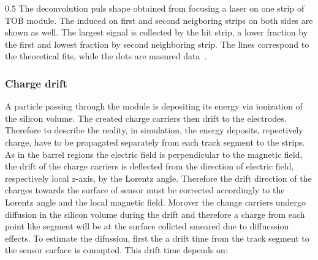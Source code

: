 

                 {0.5}       %
                 { The deconvolution puls shape obtained from focusing a laser on one strip of TOB module. The induced on first and second neigboring strips on both sides are shown as well.  The largest signal is collected by the hit strip, a lower fraction by the first and lowest fraction by second neighboring strip. The lines correspond to the theoretical fits, while the dots are masured data~\cite{Delaere:1061284}.  }


\subsubsection{Charge drift}

A particle passing through the module is depositing its energy via ionization of the silicon volume. The created charge carriers then drift to the electrodes. Therefore to describe the reality, in simulation, the energy deposits, repectively charge, have to be propagated separately from each track segment to the strips. As in the barrel regions the electric field is perpendicular to the magnetic field, the drift of the charge carriers is deflected from the direction of electric field, respectively local z-axis, by the Lorentz angle. Therefore the drift direction of the charges towards the surface of sensor must be corrected accordingly to the Lorentz angle and the local magnetic field. Morover the change carriers undergo diffusion in the silicon volume during the drift and therefore a charge from each point like segment will be at the surface collcted smeared due to diffucssion effects. To estimate the difussion, first the a drift time from the track segment to the sensor surface is comupted. This drift time depends on:

